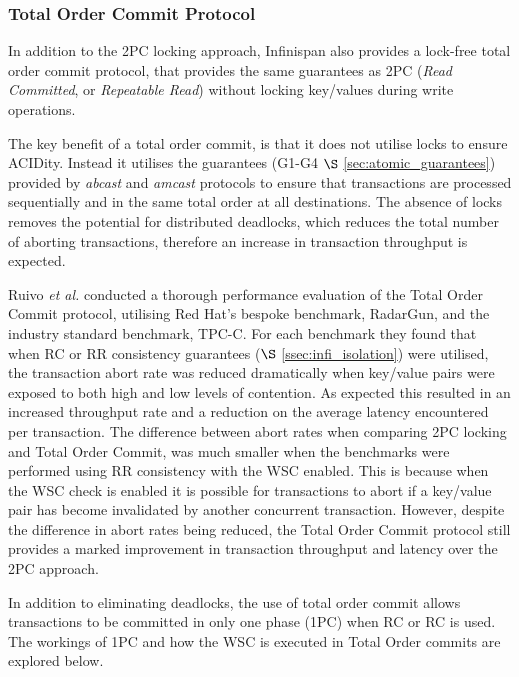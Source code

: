 	    \subsubsection{Total Order Commit Protocol} \label{sec:to_commit}
	    In addition to the 2PC locking approach, Infinispan also provides a lock-free total order commit protocol, that provides the same guarantees as 2PC (\emph{Read Committed}, or \emph{Repeatable Read}) without locking key/values during write operations.  
	    
	    The key benefit of a total order commit, is that it does not utilise locks to ensure ACIDity.  Instead it utilises the guarantees (G1-G4 $\S$ \ref{sec:atomic_guarantees}) provided by \emph{abcast} and \emph{amcast} protocols to ensure that transactions are processed sequentially and in the same total order at all destinations.  The absence of locks removes the potential for distributed deadlocks, which reduces the total number of aborting transactions, therefore an increase in transaction throughput is expected.  
	    
	    Ruivo \emph{et al.}\citep{Ruivo:2011:ETO:2120967.2121604} conducted a thorough performance evaluation of the Total Order Commit protocol, utilising Red Hat's bespoke benchmark, RadarGun\citep{RadarGun}, and the industry standard benchmark, TPC-C\citep{TPC-C}.  For each benchmark they found that when RC or RR consistency guarantees ($\S$ \ref{ssec:infi_isolation}) were utilised, the transaction abort rate was reduced dramatically when key/value pairs were exposed to both high and low levels of contention.  As expected this resulted in an increased throughput rate and a reduction on the average latency encountered per transaction.  The difference between abort rates when comparing 2PC locking and Total Order Commit, was much smaller when the benchmarks were performed using RR consistency with the WSC enabled.  This is because when the WSC check is enabled it is possible for transactions to abort if a key/value pair has become invalidated by another concurrent transaction.  However, despite the difference in abort rates being reduced, the Total Order Commit protocol still provides a marked improvement in transaction throughput and latency over the 2PC approach.  
	    
	    In addition to eliminating deadlocks,  the use of total order commit allows transactions to be committed in only one phase (1PC) when RC or RC is used.  The workings of 1PC and how the WSC is executed in Total Order commits are explored below.  
	    
